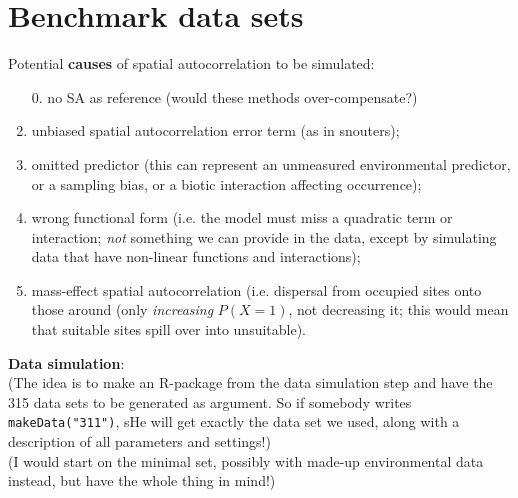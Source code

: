 \documentclass[11pt]{article}
\begin{document}
\section{Benchmark data sets}
Potential \textbf{causes} of spatial autocorrelation to be simulated:
\begin{enumerate}
\item[0.] no SA as reference (would these methods over-compensate?)
\item unbiased spatial autocorrelation error term (as in snouters);
\item omitted predictor (this can represent an unmeasured environmental predictor, or a sampling bias, or a biotic interaction affecting occurrence); 
\item wrong functional form (i.e. the model must miss a quadratic term or interaction; \emph{not} something we can provide in the data, except by simulating data that have non-linear functions and interactions);
\item mass-effect spatial autocorrelation (i.e. dispersal from occupied sites onto those around (only \emph{increasing} $P(X=1)$, not decreasing it; this would mean that suitable sites spill over into unsuitable).
\end{enumerate}
%
\textbf{Data simulation}:\\
(The idea is to make an R-package from the data simulation step and have the 315 data sets to be generated as argument. So if somebody writes \verb|makeData("311")|, sHe will get exactly the data set we used, along with a description of all parameters and settings!)\\
(I would start on the minimal set, possibly with made-up environmental data instead, but have the whole thing in mind!)
\end{document}
